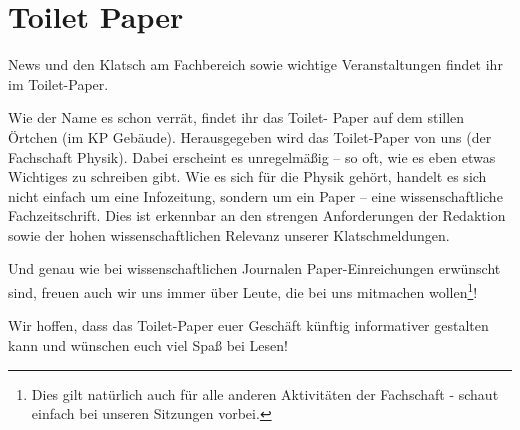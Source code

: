 \vspace{-6ex}
\section{Toilet Paper}
\vspace{-3ex}
\begin{multicols*}{2}
News und den Klatsch am Fachbereich sowie wichtige Veranstaltungen findet ihr im Toilet-Paper.

Wie der Name es schon verrät, findet ihr das Toilet- Paper auf dem stillen Örtchen (im KP Gebäude).  
Herausgegeben wird das Toilet-Paper von uns (der Fachschaft Physik). Dabei erscheint es unregelmäßig – so oft, wie es eben etwas Wichtiges zu schreiben gibt. 
Wie es sich für die Physik gehört, handelt es sich nicht einfach um eine Infozeitung, sondern um ein Paper – eine wissenschaftliche Fachzeitschrift. Dies ist erkennbar an den strengen Anforderungen der Redaktion sowie der hohen wissenschaftlichen Relevanz unserer Klatschmeldungen.

Und genau wie bei wissenschaftlichen Journalen Paper-Einreichungen erwünscht sind, freuen auch wir uns immer über Leute, die bei uns mitmachen wollen\footnote{Dies gilt natürlich auch für alle anderen Aktivitäten der Fachschaft - schaut einfach bei unseren Sitzungen vorbei.}!

Wir hoffen, dass das Toilet-Paper euer Geschäft künftig informativer gestalten kann und wünschen euch viel Spaß bei Lesen! 
\end{multicols*}
